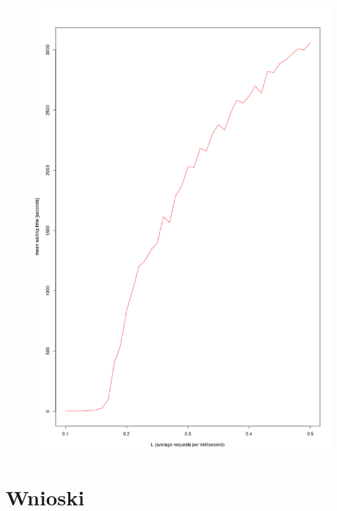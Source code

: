 \documentclass[12pt,oneside,a4paper]{book} %
\theoremstyle{break}
\begin{document}
\begin{figure}[H]
  \centering
  \includegraphics*[width=\textwidth]{image.png}
\end{figure}

\section*{Wnioski}
\end{document}
